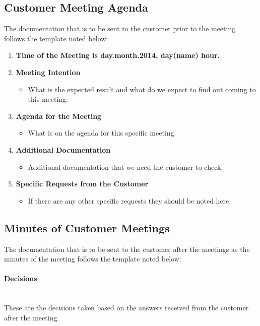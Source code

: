 \documentclass[../document]{subfiles}
\begin{document}
\newpage
\subsection{Customer Meeting Agenda}
\label{customer_meeting_agenda}
The documentation that is to be sent to the customer prior to the meeting follows the template noted below:

\begin{enumerate}
	\item
	\textbf{Time of the Meeting is day.month.2014, day(name) hour.}
	\item
	\textbf{Meeting Intention}
	\begin{itemize}
		\item
		What is the expected result and what do we expect to find out coming to this meeting.
	\end{itemize}
	\item
	\textbf{Agenda for the Meeting}
	\begin{itemize}
		\item
		What is on the agenda for this specific meeting.
	\end{itemize}
	\item
	\textbf{Additional Documentation}
	\begin{itemize}
		\item
		Additional documentation that we need the customer to check.
	\end{itemize}
	\item
	\textbf{Specific Requests from the Customer}
	\begin{itemize}
		\item
		If there are any other specific requests they should be noted here.
	\end{itemize}
\end{enumerate}

\newpage
\subsection{Minutes of Customer Meetings}
\label{minutes_of_customer_meetings}
The documentation that is to be sent to the customer after the meetings as the minutes of the meeting follows the template noted below:

\paragraph{Decisions} \ \\
These are the decisions taken based on the answers received from the customer after the meeting.
\end{document}
